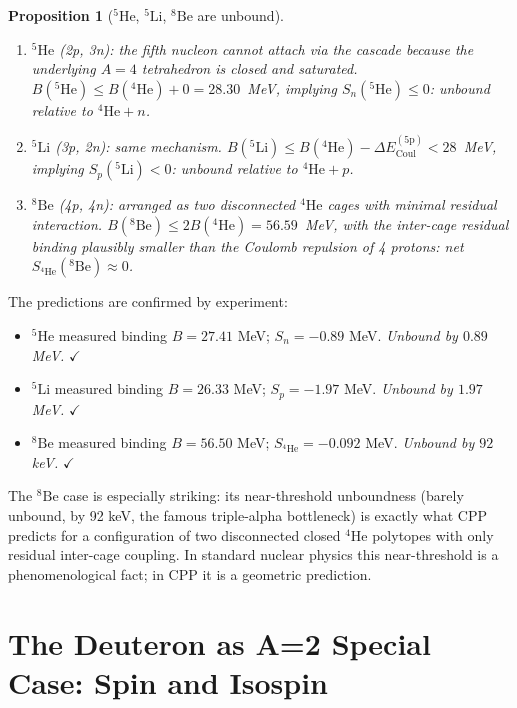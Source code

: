 \documentclass[11pt,letterpaper]{article}
\newtheorem{proposition}[theorem]{Proposition}
\begin{document}
\begin{proposition}[$^{5}\mathrm{He}$, $^{5}\mathrm{Li}$, $^{8}\mathrm{Be}$ are unbound]
\label{prop:unbound_5_8}
\begin{enumerate}
\item ${}^{5}\mathrm{He}$ (2p, 3n): the fifth nucleon cannot attach via the cascade because the underlying $A=4$ tetrahedron is closed and saturated. $B({}^{5}\mathrm{He}) \leq B({}^{4}\mathrm{He}) + 0 = 28.30$~MeV, implying $S_n({}^{5}\mathrm{He}) \leq 0$: unbound relative to ${}^{4}\mathrm{He} + n$.
\item ${}^{5}\mathrm{Li}$ (3p, 2n): same mechanism. $B({}^{5}\mathrm{Li}) \leq B({}^{4}\mathrm{He}) - \Delta E_{\mathrm{Coul}}^{(\mathrm{5p})} < 28$~MeV, implying $S_p({}^{5}\mathrm{Li}) < 0$: unbound relative to ${}^{4}\mathrm{He} + p$.
\item ${}^{8}\mathrm{Be}$ (4p, 4n): arranged as two disconnected ${}^{4}\mathrm{He}$ cages with minimal residual interaction. $B({}^{8}\mathrm{Be}) \leq 2B({}^{4}\mathrm{He}) = 56.59$~MeV, with the inter-cage residual binding plausibly smaller than the Coulomb repulsion of 4 protons: net $S_{{}^{4}\mathrm{He}}({}^{8}\mathrm{Be}) \approx 0$.
\end{enumerate}
\end{proposition}

The predictions are confirmed by experiment:
\begin{itemize}
\item ${}^{5}\mathrm{He}$ measured binding $B = 27.41$ MeV; $S_n = -0.89$ MeV. \emph{Unbound by $0.89$ MeV.} $\checkmark$
\item ${}^{5}\mathrm{Li}$ measured binding $B = 26.33$ MeV; $S_p = -1.97$ MeV. \emph{Unbound by $1.97$ MeV.} $\checkmark$
\item ${}^{8}\mathrm{Be}$ measured binding $B = 56.50$ MeV; $S_{{}^{4}\mathrm{He}} = -0.092$ MeV. \emph{Unbound by $92$ keV.} $\checkmark$
\end{itemize}

The ${}^{8}\mathrm{Be}$ case is especially striking: its near-threshold unboundness (barely unbound, by 92 keV, the famous triple-alpha bottleneck) is exactly what CPP predicts for a configuration of two disconnected closed ${}^{4}\mathrm{He}$ polytopes with only residual inter-cage coupling. In standard nuclear physics this near-threshold is a phenomenological fact; in CPP it is a geometric prediction.

\section{The Deuteron as A=2 Special Case: Spin and Isospin}
\label{sec:deuteron_quantum_numbers}
\end{document}
